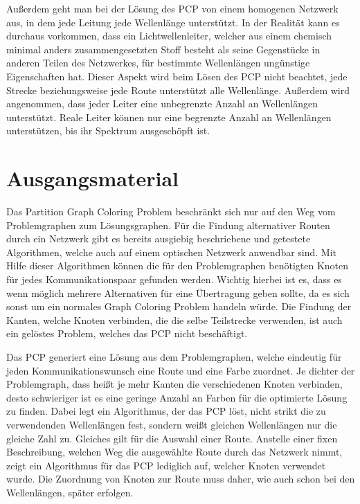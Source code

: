 Außerdem geht man bei der Lösung des PCP von einem homogenen Netzwerk aus, in dem jede Leitung jede Wellenlänge unterstützt. In der Realität kann es durchaus vorkommen, dass ein
Lichtwellenleiter, welcher aus einem chemisch minimal anders zusammengesetzten Stoff besteht als seine Gegenstücke in anderen Teilen des Netzwerkes, für bestimmte Wellenlängen
ungünstige Eigenschaften hat. Dieser Aspekt wird beim Lösen des PCP nicht beachtet, jede Strecke beziehungsweise jede Route unterstützt alle Wellenlänge. Außerdem wird angenommen, 
dass jeder Leiter eine unbegrenzte Anzahl an Wellenlängen unterstützt. Reale Leiter können nur eine begrenzte Anzahl an Wellenlängen unterstützen, bis ihr Spektrum ausgeschöpft ist.

\section{Ausgangsmaterial}
Das Partition Graph Coloring Problem beschränkt sich nur auf den Weg vom Problemgraphen zum Lösungsgraphen. Für die Findung alternativer Routen durch ein Netzwerk gibt es 
bereits ausgiebig beschriebene und getestete Algorithmen, welche auch auf einem optischen Netzwerk anwendbar sind. Mit Hilfe dieser Algorithmen können die für den
Problemgraphen benötigten Knoten für jedes Kommunikationspaar gefunden werden. Wichtig hierbei ist es, dass es wenn möglich mehrere Alternativen für eine Übertragung geben sollte,
da es sich sonst um ein normales Graph Coloring Problem handeln würde. Die Findung der Kanten, welche Knoten verbinden, die die selbe Teilstrecke verwenden, ist auch ein
gelöstes Problem, welches das PCP nicht beschäftigt.

Das PCP generiert eine Lösung aus dem Problemgraphen, welche eindeutig für jeden Kommunikationswunsch eine Route und eine Farbe zuordnet. Je dichter der Problemgraph, dass heißt
je mehr Kanten die verschiedenen Knoten verbinden, desto schwieriger ist es eine geringe Anzahl an Farben für die optimierte Lösung zu finden. Dabei legt ein Algorithmus, der das
PCP löst, nicht strikt die zu verwendenden Wellenlängen fest, sondern weißt gleichen Wellenlängen nur die gleiche Zahl zu. Gleiches gilt für die Auswahl einer Route. Anstelle
einer fixen Beschreibung, welchen Weg die ausgewählte Route durch das Netzwerk nimmt, zeigt ein Algorithmus für das PCP lediglich auf, welcher Knoten verwendet wurde. 
Die Zuordnung von Knoten zur Route muss daher, wie auch schon bei den Wellenlängen, später erfolgen.

